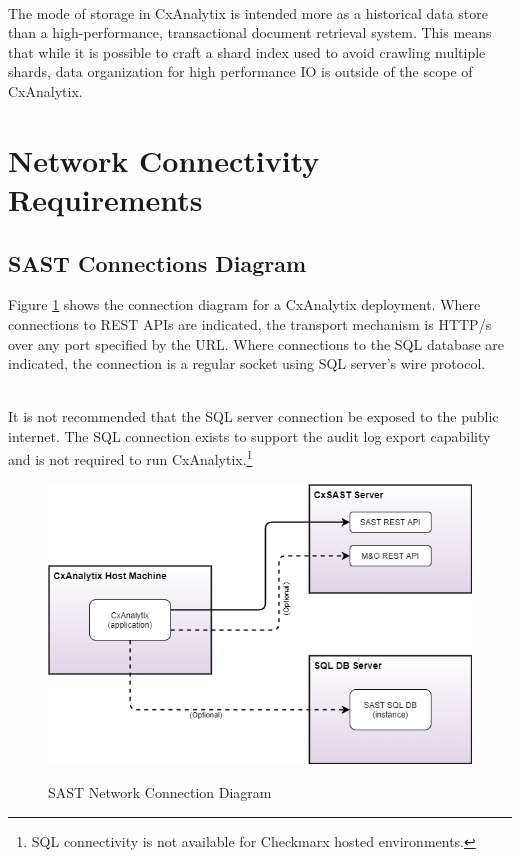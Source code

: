 \noindent\\The mode of storage in CxAnalytix is intended more as a historical data store than a high-performance, transactional
document retrieval system.  This means that while it is possible to craft a shard index used to avoid crawling multiple shards, 
data organization for high performance IO is outside of the scope of CxAnalytix.


\section{Network Connectivity Requirements}

\subsection{SAST Connections Diagram}
Figure \ref{fig:SAST-network} shows the connection diagram for a CxAnalytix deployment. Where connections to REST APIs are indicated, the transport mechanism is 
HTTP/s over any port specified by the URL. Where connections to the SQL database are indicated, the connection is a regular socket using SQL server's wire protocol.

\noindent\\It is not recommended that the SQL server connection be exposed to the public internet. The SQL connection exists to support the audit log export capability 
and is not required to run CxAnalytix.\footnote{SQL connectivity is not available for Checkmarx hosted environments.}

\begin{figure}[h]
    \caption{SAST Network Connection Diagram}
    \includegraphics[width=\textwidth]{graphics/Deployment-SAST-connections.png}
    \label{fig:SAST-network}
\end{figure}

